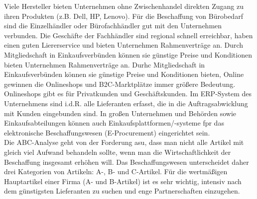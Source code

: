 \documentclass[a4paper, 12pt]{report}
\begin{document}
\begin{multicols}{2}
Viele Hersteller bieten Unternehmen ohne Zwischenhandel direkten Zugang zu ihren
Produkten (z.B. Dell, HP, Lenovo). Für die Beschaffung von Bürobedarf sind die
Einzelhändler oder Bürofachhändler gut mit den Unternehmen verbunden. Die
Geschäfte der Fachhändler sind regional schnell erreichbar, haben einen guten
Liererservice und bieten Unternehmen Rahmenverträge an. Durch Mitgliedschaft
in Einkaufsverbünden können sie günstige Preise und Konditionen bieten
Unternehmen Rahmenverträge an. Durhc Mitgliedschaft in Einkaufsverbünden können
sie günstige Preise und Konditionen bieten, Online gewinnen die Onlineshops und
B2C-Marktplätze immer größere Bedeutung. Onlineshops gibt es für Privatkunden
und Geschäftskunden. Im ERP-System des Unternehmens sind i.d.R. alle Lieferanten
erfasst, die in die Auftragsabwicklung mit Kunden eingebunden sind. In großen
Unternehmen und Behörden sowie Einkaufsabteilungen können auch
Einkaufsplattformen/-systeme fpr das elektronische Beschaffungswesen
(E-Procurement) eingerichtet sein. \\

Die ABC-Analyse geht von der Forderung asu, dass man nicht alle Artikel mit
gleich viel Aufwand behandeln sollte, wenn man die Wirtschaftlichkeit der
Beschaffung insgesamt erhöhen will. Das Beschaffungswesen unterscheidet daher
drei Kategorien von Artikeln: A-, B- und C-Artikel. Für die wertmäßigen
Hauptartikel einer Firma (A- und B-Artikel) ist es sehr wichtig, intensiv nach
dem günstigsten Lieferanten zu suchen und enge Partnerschaften einzugehen.


\end{multicols}
\end{document}
